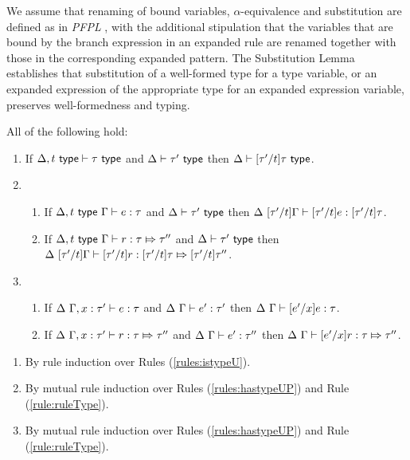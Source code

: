 {{{{We assume that renaming of bound variables, $\alpha$-equivalence and substitution are defined as in \emph{PFPL} \cite{pfpl}, with the additional stipulation that the variables that are bound by the branch expression in an expanded rule are renamed together with those in the corresponding expanded pattern. The Substitution Lemma establishes that substitution of a well-formed type for a type variable, or an expanded expression of the appropriate type for an expanded expression variable, preserves well-formedness and typing.
\begin{lemma}[Substitution]\label{lemma:substitution-UP} All of the following hold:
\begin{enumerate}
\item If $\Delta, t~\mathsf{type} \vdash \tau~\mathsf{type}$ and $\Delta \vdash \tau'~\mathsf{type}$ then $\Delta \vdash [\tau'/t]\tau~\mathsf{type}$.
\item \begin{enumerate}
  \item If $\Delta, t~\mathsf{type}~\Gamma \vdash e : \tau$ and $\Delta \vdash \tau'~\mathsf{type}$ then $\Delta~[\tau'/t]\Gamma \vdash [\tau'/t]e : [\tau'/t]\tau$.
  \item If $\Delta, t~\mathsf{type}~\Gamma \vdash r : \tau \Mapsto \tau''$ and $\Delta \vdash \tau'~\mathsf{type}$ then $\Delta~[\tau'/t]\Gamma \vdash [\tau'/t]r : [\tau'/t]\tau \Mapsto [\tau'/t]\tau''$.
  \end{enumerate}
\item \begin{enumerate}
  \item If $\Delta~\Gamma, x : \tau' \vdash e : \tau$ and $\Delta~\Gamma \vdash e' : \tau'$ then $\Delta~\Gamma \vdash [e'/x]e : \tau$.
  \item If $\Delta~\Gamma, x : \tau' \vdash r : \tau \Mapsto \tau''$ and $\Delta~\Gamma \vdash e' : \tau''$ then $\Delta~\Gamma \vdash [e'/x]r : \tau \Mapsto \tau''$.
  \end{enumerate}
\end{enumerate}\end{lemma}
\begin{proof-sketch}
\begin{enumerate}
\item By rule induction over Rules (\ref{rules:istypeU}).
\item By mutual rule induction over Rules (\ref{rules:hastypeUP}) and Rule (\ref{rule:ruleType}).
\item By mutual rule induction over Rules (\ref{rules:hastypeUP}) and Rule (\ref{rule:ruleType}).
\end{enumerate}
\end{proof-sketch}

}}}}
